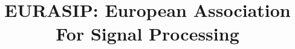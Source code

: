 \documentclass[twocolumn]{bmcart}%
\begin{document}
\begin{frontmatter}

  \begin{fmbox}


    \title{EURASIP: European Association For Signal Processing}


    \author[
      addressref={aff1},                   %
      corref={aff1},                       %
      email={jane.e.doe@cambridge.co.uk}   %
    ]{ }

    \author[
      addressref={aff1,aff2},
      email={john.RS.Smith@cambridge.co.uk}
    ]{ }


    \address[id=aff1]{%
      ,             %
      ,          %
      ,                              %
    }
    \address[id=aff2]{%
      ,
      ,
      ,
    }


\end{fmbox}
\end{frontmatter}
\end{document}
